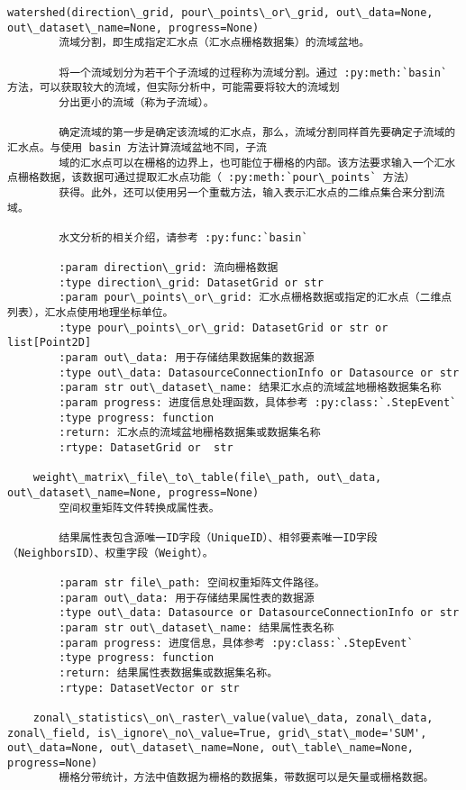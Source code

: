\documentclass[11pt]{article}
\begin{document}
\begin{Verbatim}[commandchars=\\\{\}]
    watershed(direction\_grid, pour\_points\_or\_grid, out\_data=None, out\_dataset\_name=None, progress=None)
        流域分割，即生成指定汇水点（汇水点栅格数据集）的流域盆地。
        
        将一个流域划分为若干个子流域的过程称为流域分割。通过 :py:meth:`basin` 方法，可以获取较大的流域，但实际分析中，可能需要将较大的流域划
        分出更小的流域（称为子流域）。
        
        确定流域的第一步是确定该流域的汇水点，那么，流域分割同样首先要确定子流域的汇水点。与使用 basin 方法计算流域盆地不同，子流
        域的汇水点可以在栅格的边界上，也可能位于栅格的内部。该方法要求输入一个汇水点栅格数据，该数据可通过提取汇水点功能（ :py:meth:`pour\_points` 方法）
        获得。此外，还可以使用另一个重载方法，输入表示汇水点的二维点集合来分割流域。
        
        水文分析的相关介绍，请参考 :py:func:`basin`
        
        :param direction\_grid: 流向栅格数据
        :type direction\_grid: DatasetGrid or str
        :param pour\_points\_or\_grid: 汇水点栅格数据或指定的汇水点（二维点列表），汇水点使用地理坐标单位。
        :type pour\_points\_or\_grid: DatasetGrid or str or list[Point2D]
        :param out\_data: 用于存储结果数据集的数据源
        :type out\_data: DatasourceConnectionInfo or Datasource or str
        :param str out\_dataset\_name: 结果汇水点的流域盆地栅格数据集名称
        :param progress: 进度信息处理函数，具体参考 :py:class:`.StepEvent`
        :type progress: function
        :return: 汇水点的流域盆地栅格数据集或数据集名称
        :rtype: DatasetGrid or  str
    
    weight\_matrix\_file\_to\_table(file\_path, out\_data, out\_dataset\_name=None, progress=None)
        空间权重矩阵文件转换成属性表。
        
        结果属性表包含源唯一ID字段（UniqueID）、相邻要素唯一ID字段（NeighborsID）、权重字段（Weight）。
        
        :param str file\_path: 空间权重矩阵文件路径。
        :param out\_data: 用于存储结果属性表的数据源
        :type out\_data: Datasource or DatasourceConnectionInfo or str
        :param str out\_dataset\_name: 结果属性表名称
        :param progress: 进度信息，具体参考 :py:class:`.StepEvent`
        :type progress: function
        :return: 结果属性表数据集或数据集名称。
        :rtype: DatasetVector or str
    
    zonal\_statistics\_on\_raster\_value(value\_data, zonal\_data, zonal\_field, is\_ignore\_no\_value=True, grid\_stat\_mode='SUM', out\_data=None, out\_dataset\_name=None, out\_table\_name=None, progress=None)
        栅格分带统计，方法中值数据为栅格的数据集，带数据可以是矢量或栅格数据。
        

\end{Verbatim}
\end{document}
